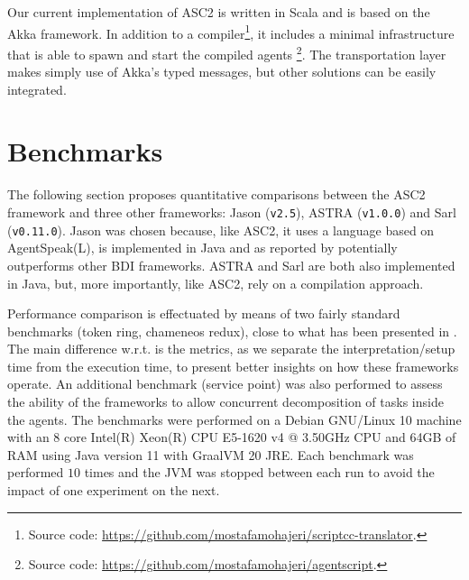 Our current implementation of ASC2 is written in Scala and is based on the Akka framework. In addition to a compiler\footnote{Source code: 
\url{https://github.com/mostafamohajeri/scriptcc-translator}.}, it includes a minimal infrastructure that is able to spawn and start the compiled agents%
\footnote{Source code: \url{https://github.com/mostafamohajeri/agentscript}.
}. The transportation layer makes simply use of Akka's typed messages, but other solutions can be easily integrated.

\section{Benchmarks}
\label{sec_bench}

The following section proposes quantitative comparisons between the ASC2 framework and three other frameworks: Jason (\verb+v2.5+), ASTRA (\verb+v1.0.0+) and Sarl (\verb+v0.11.0+). Jason \cite{Bordini2005} was chosen because, like ASC2, it uses a language based on AgentSpeak(L), is implemented in Java and as reported by \cite{Cardoso2013} potentially outperforms other BDI frameworks. ASTRA and Sarl are both also implemented in Java, but, more importantly, like ASC2, rely on a compilation approach. %

Performance comparison is effectuated by means of two fairly standard benchmarks (token ring, chameneos redux), close to what has been presented in \cite{Cardoso2013}. The main difference w.r.t. \cite{Cardoso2013} is the metrics, as we separate the interpretation/setup time from the execution time, to present better insights on how these frameworks operate. %
An additional benchmark (service point) was also performed to assess the ability of the frameworks to allow concurrent decomposition of tasks inside the agents. The benchmarks were performed on a {Debian GNU/Linux 10} machine with an 8 core {Intel(R) Xeon(R) CPU E5-1620 v4 @ 3.50GHz} CPU and {64GB} of RAM using Java version {11} with {GraalVM 20} JRE.  Each benchmark was performed $10$ times and the JVM was stopped between each run to avoid the impact of one experiment on the next. %


